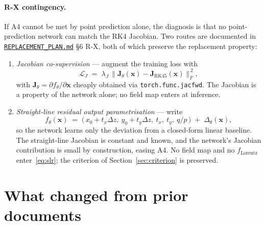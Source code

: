 \documentclass[11pt,a4paper]{article}
\newcommand{\qop}{q/p}
\newcommand{\dz}{\Delta z}
\newcommand{\Jac}{\mathbf{J}}
\newcommand{\loss}{\mathcal{L}}
\begin{document}
\paragraph{R-X contingency.} If A4 cannot be met by point prediction alone,
the diagnosis is that no point-prediction network can match the RK4
Jacobian. Two routes are documented in
\href{run:../../experiments/gen_3/REPLACEMENT_PLAN.md}{\texttt{REPLACEMENT\_PLAN.md}}
§6 R-X, both of which preserve the replacement property:
\begin{enumerate}
\item \emph{Jacobian co-supervision} --- augment the training loss with
\begin{equation}\label{eq:jacsup}
\loss_J \;=\; \lambda_J \,
\big\| \Jac_\theta(\mathbf{x}) - \Jac_\mathrm{RK45}(\mathbf{x}) \big\|_F^{\,2},
\end{equation}
with $\Jac_\theta = \partial f_\theta / \partial \mathbf{x}$ cheaply
obtained via \texttt{torch.func.jacfwd}. The Jacobian is a property of the
network alone; no field map enters at inference.
\item \emph{Straight-line residual output parametrisation} --- write
\begin{equation}\label{eq:slr}
f_\theta(\mathbf{x}) \;=\;
\big(\,x_0 + t_x \dz,\ y_0 + t_y \dz,\ t_x,\ t_y,\ \qop\,\big)
\;+\;
\Delta_\theta(\mathbf{x}),
\end{equation}
so the network learns only the deviation from a closed-form linear
baseline. The straight-line Jacobian is constant and known, and the
network's Jacobian contribution is small by construction, easing A4. No
field map and no $f_\mathrm{Lorentz}$ enter~\eqref{eq:slr}; the criterion
of Section~\ref{sec:criterion} is preserved.
\end{enumerate}

\section{What changed from prior documents}\label{sec:changed}
\end{document}

